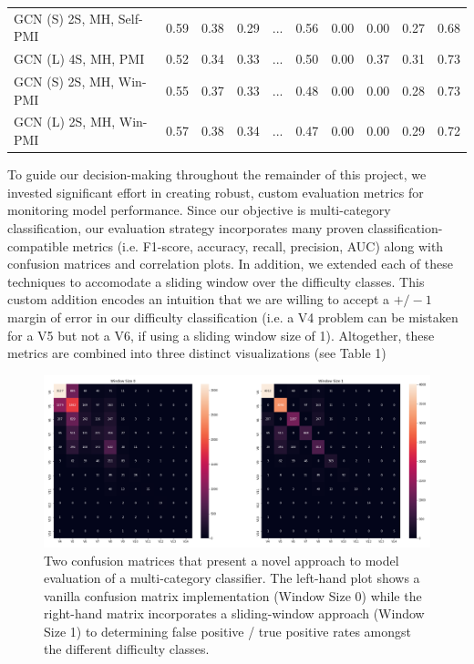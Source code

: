 \documentclass{article}
\begin{document}
\begin{table}[h!]
\begin{tabular}{@{}lccclccccc@{}}
GCN (S) 2S, MH, Self-PMI    & 0.59  & 0.38  & 0.29  & ... & 0.56 & 0.00 & 0.00 & 0.27            & 0.68            \\
GCN (L) 4S, MH, PMI         & 0.52  & 0.34  & 0.33  & ... & 0.50 & 0.00 & 0.37 & 0.31            & 0.73            \\
GCN (S) 2S, MH, Win-PMI     & 0.55  & 0.37  & 0.33  & ... & 0.48 & 0.00 & 0.00 & 0.28            & 0.73            \\
GCN (L) 2S, MH, Win-PMI     & 0.57  & 0.38  & 0.34  & ... & 0.47 & 0.00 & 0.00 & 0.29            & 0.72            \\ \bottomrule
\end{tabular}
\end{table}

To guide our decision-making throughout the remainder of this project, we invested significant effort in creating robust, custom evaluation metrics for monitoring model performance. Since our objective is multi-category classification, our evaluation strategy incorporates many proven classification-compatible metrics (i.e. F1-score, accuracy, recall, precision, AUC) along with confusion matrices and correlation plots. In addition, we extended each of these techniques to accomodate a sliding window over the difficulty classes. This custom addition encodes an intuition that we are willing to accept a \(+/- 1\) margin of error in our difficulty classification (i.e. a V4 problem can be mistaken for a V5 but not a V6, if using a sliding window size of 1). Altogether, these metrics are combined into three distinct visualizations (see Table 1) 

\begin{figure}
\centering
\includegraphics[width=.8\linewidth]{confusion_window}
\caption{Two confusion matrices that present a novel approach to model evaluation of a multi-category classifier. The left-hand plot shows a vanilla confusion matrix implementation (Window Size 0) while the right-hand matrix incorporates a sliding-window approach (Window Size 1) to determining false positive / true positive rates amongst the different difficulty classes.}
\end{figure}
\end{document}
